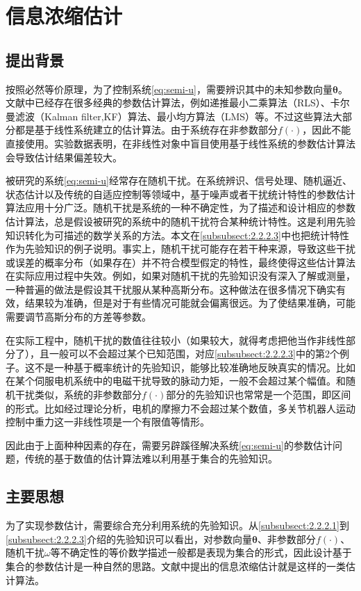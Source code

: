\section{信息浓缩估计}\label{sect:2.3}
\subsection{提出背景}\label{subsect:2.3.1}
按照必然等价原理，为了控制系统\eqref{eq:semi-u}，需要辨识其中的未知参数向量$\bm{\theta}$。文献中已经存在很多经典的参数估计算法，例如递推最小二乘算法（RLS）、卡尔曼滤波（Kalman filter,KF）算法、最小均方算法（LMS）等。不过这些算法大部分都是基于线性系统建立的估计算法。由于系统存在非参数部分$f(\cdot)$，因此不能直接使用。实验数据表明，在非线性对象中盲目使用基于线性系统的参数估计算法会导致估计结果偏差较大。

被研究的系统\eqref{eq:semi-u}经常存在随机干扰。在系统辨识、信号处理、随机逼近、状态估计以及传统的自适应控制等领域中，基于噪声或者干扰统计特性的参数估计算法应用十分广泛。随机干扰是系统的一种不确定性，为了描述和设计相应的参数估计算法，总是假设被研究的系统中的随机干扰符合某种统计特性。这是利用先验知识转化为可描述的数学关系的方法。本文在\ref{subsubsect:2.2.2.3}中也把统计特性作为先验知识的例子说明。事实上，随机干扰可能存在若干种来源，导致这些干扰或误差的概率分布（如果存在）并不符合模型假定的特性，最终使得这些估计算法在实际应用过程中失效。例如，如果对随机干扰的先验知识没有深入了解或测量，一种普遍的做法是假设其干扰服从某种高斯分布。这种做法在很多情况下确实有效，结果较为准确，但是对于有些情况可能就会偏离很远。为了使结果准确，可能需要调节高斯分布的方差等参数。

在实际工程中，随机干扰的数值往往较小（如果较大，就得考虑把他当作非线性部分了），且一般可以不会超过某个已知范围，对应\ref{subsubsect:2.2.2.3}中的第2个例子。这不是一种基于概率统计的先验知识，能够比较准确地反映真实的情况。比如在某个伺服电机系统中的电磁干扰导致的脉动力矩，一般不会超过某个幅值。和随机干扰类似，系统的非参数部分$f(\cdot)$部分的先验知识也常常是一个范围，即区间的形式。比如经过理论分析，电机的摩擦力不会超过某个数值，多关节机器人运动控制中重力这一非线性项是一个有限值等情形。

因此由于上面种种因素的存在，需要另辟蹊径解决系统\eqref{eq:semi-u}的参数估计问题，传统的基于数值的估计算法难以利用基于集合的先验知识。
\subsection{主要思想}\label{subsect:2.3.2}
为了实现参数估计，需要综合充分利用系统的先验知识。从\ref{subsubsect:2.2.2.1}到\ref{subsubsect:2.2.2.3}介绍的先验知识可以看出，对参数向量$\bm{\theta}$、非参数部分$f(\cdot)$、随机干扰$\omega$等不确定性的等价数学描述一般都是表现为集合的形式，因此设计基于集合的参数估计是一种自然的思路。文献\cite{MaLum2009}中提出的信息浓缩估计就是这样的一类估计算法。

